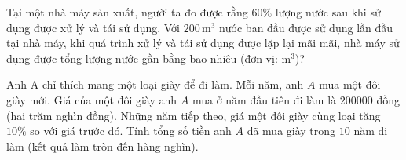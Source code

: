 \begin{ex}%
	Tại một nhà máy sản xuất, người ta đo được rằng $60\%$ lượng nước sau khi sử dụng được xử lý và tái sử dụng. Với $200$\,m$^3$ nước ban đầu được sử dụng lần đầu tại nhà máy, khi quá trình xử lý  và tái sử dụng được lặp lại mãi mãi, nhà máy sử dụng được tổng lượng nước gần bằng bao nhiêu (đơn vị: m$^3$)?
\end{ex}

\begin{ex}%
	Anh A chỉ thích mang một loại giày để đi làm. Mỗi năm, anh $A$ mua một đôi giày mới. Giá của  một đôi giày anh $A$ mua ở năm đầu tiên đi làm là $200000$ đồng (hai trăm nghìn đồng). Những năm tiếp theo, giá một đôi giày cùng loại tăng $10 \%$ so với giá trước đó. Tính tổng số tiền anh $A$ đã mua giày trong $10$ năm đi làm (kết quả làm tròn đến hàng nghìn).
\end{ex}

